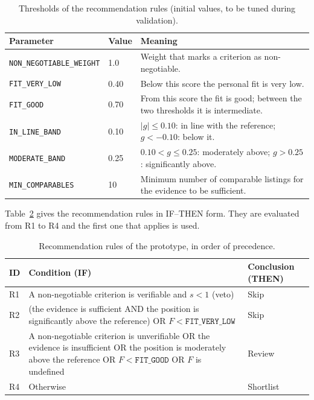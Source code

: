 \documentclass[12pt,a4paper]{report}
\begin{document}
\begin{table}[H]
\centering
\small
\caption{Thresholds of the recommendation rules (initial values, to be
tuned during validation).}
\label{tab:parameters}
\begin{tabularx}{\textwidth}{p{4.6cm} p{1.4cm} X}
\toprule
\textbf{Parameter} & \textbf{Value} & \textbf{Meaning}\\
\midrule
\texttt{NON\_NEGOTIABLE\_WEIGHT} & 1.0 &
Weight that marks a criterion as non-negotiable.\\
\texttt{FIT\_VERY\_LOW} & 0.40 &
Below this score the personal fit is very low.\\
\texttt{FIT\_GOOD} & 0.70 &
From this score the fit is good; between the two thresholds it is
intermediate.\\
\texttt{IN\_LINE\_BAND} & 0.10 &
$|g| \le 0.10$: in line with the reference; $g < -0.10$: below it.\\
\texttt{MODERATE\_BAND} & 0.25 &
$0.10 < g \le 0.25$: moderately above; $g > 0.25$: significantly above.\\
\texttt{MIN\_COMPARABLES} & 10 &
Minimum number of comparable listings for the evidence to be
sufficient.\\
\bottomrule
\end{tabularx}
\end{table}

Table~\ref{tab:rules} gives the recommendation rules in IF--THEN form. They
are evaluated from R1 to R4 and the first one that applies is used.

\begin{table}[H]
\centering
\small
\caption{Recommendation rules of the prototype, in order of precedence.}
\label{tab:rules}
\begin{tabularx}{\textwidth}{p{0.8cm} X p{2.2cm}}
\toprule
\textbf{ID} & \textbf{Condition (IF)} & \textbf{Conclusion (THEN)}\\
\midrule
R1 & A non-negotiable criterion is verifiable and $s < 1$ (veto) & Skip\\
\addlinespace
R2 & (the evidence is sufficient AND the position is significantly above
the reference) OR $F < \texttt{FIT\_VERY\_LOW}$ & Skip\\
\addlinespace
R3 & A non-negotiable criterion is unverifiable OR the evidence is
insufficient OR the position is moderately above the reference OR
$F < \texttt{FIT\_GOOD}$ OR $F$ is undefined & Review\\
\addlinespace
R4 & Otherwise & Shortlist\\
\bottomrule
\end{tabularx}
\end{table}
\end{document}
